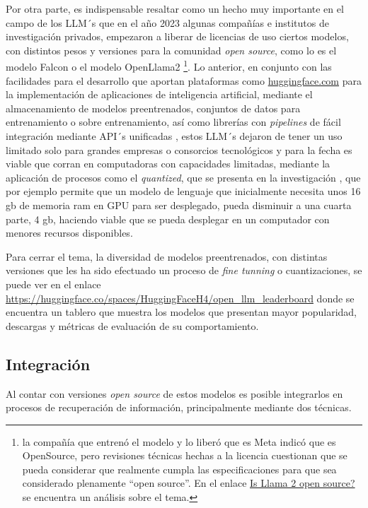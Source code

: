\documentclass[
  12pt,
  openany]{book}
\begin{document}
Por otra parte, es indispensable resaltar como un hecho muy importante en el campo de los LLM´s que en el año 2023 algunas compañías e institutos de investigación privados, empezaron a liberar de licencias de uso ciertos modelos, con distintos pesos y versiones para la comunidad \emph{open source}, como lo es el modelo Falcon \citep{penedo2023} o el modelo OpenLlama2 \citep{touvron2023} \footnote{la compañía que entrenó el modelo y lo liberó que es Meta indicó que es OpenSource, pero revisiones técnicas hechas a la licencia cuestionan que se pueda considerar que realmente cumpla las especificaciones para que sea considerado plenamente ``open source''. En el enlace \href{https://opensourceconnections.com/blog/2023/07/19/is-llama-2-open-source-no-and-perhaps-we-need-a-new-definition-of-open/}{Is Llama 2 open source?} se encuentra un análisis sobre el tema.}. Lo anterior, en conjunto con las facilidades para el desarrollo que aportan plataformas como \url{huggingface.com} para la implementación de aplicaciones de inteligencia artificial, mediante el almacenamiento de modelos preentrenados, conjuntos de datos para entrenamiento o sobre entrenamiento, así como librerías con \emph{pipelines} de fácil integración mediante API´s unificadas \citep{wolf2019}, estos LLM´s dejaron de tener un uso limitado solo para grandes empresas o consorcios tecnológicos y para la fecha es viable que corran en computadoras con capacidades limitadas, mediante la aplicación de procesos como el \emph{quantized}, que se presenta en la investigación \citep{dettmers2023}, que por ejemplo permite que un modelo de lenguaje que inicialmente necesita unos 16 gb de memoria ram en GPU para ser desplegado, pueda disminuir a una cuarta parte, 4 gb, haciendo viable que se pueda desplegar en un computador con menores recursos disponibles.

Para cerrar el tema, la diversidad de modelos preentrenados, con distintas versiones que les ha sido efectuado un proceso de \emph{fine tunning} o cuantizaciones, se puede ver en el enlace \citep{openllm} \url{https://huggingface.co/spaces/HuggingFaceH4/open_llm_leaderboard} donde se encuentra un tablero que muestra los modelos que presentan mayor popularidad, descargas y métricas de evaluación de su comportamiento.

\hypertarget{int}{%
\subsection{Integración}\label{int}}

Al contar con versiones \emph{open source} de estos modelos es posible integrarlos en procesos de recuperación de información, principalmente mediante dos técnicas.
\end{document}
